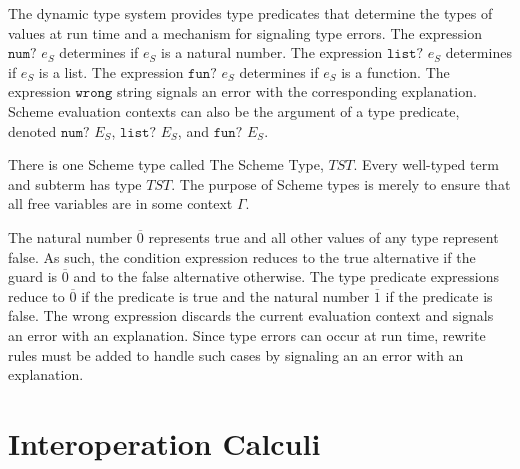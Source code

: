 The dynamic type system provides type predicates that determine the types of values at run time and a mechanism for signaling type errors.  The expression $\mathtt{num?}$ $e_{S}$ determines if $e_{S}$ is a natural number.  The expression $\mathtt{list?}$ $e_{S}$ determines if $e_{S}$ is a list.  The expression $\mathtt{fun?}$ $e_{S}$ determines if $e_{S}$ is a function.  The expression $\mathtt{wrong}$ string signals an error with the corresponding explanation.  Scheme evaluation contexts can also be the argument of a type predicate, denoted $\mathtt{num?}$ $E_{S}$, $\mathtt{list?}$ $E_{S}$, and $\mathtt{fun?}$ $E_{S}$.

There is one Scheme type called The Scheme Type, $TST$.  Every well-typed term and subterm has type $TST$.  The purpose of Scheme types is merely to ensure that all free variables are in some context $\Gamma$.

The natural number $\overline{0}$ represents true and all other values of any type represent false.  As such, the condition expression reduces to the true alternative if the guard is $\overline{0}$ and to the false alternative otherwise.  The type predicate expressions reduce to $\overline{0}$ if the predicate is true and the natural number $\overline{1}$ if the predicate is false.  The wrong expression discards the current evaluation context and signals an error with an explanation.  Since type errors can occur at run time, rewrite rules must be added to handle such cases by signaling an an error with an explanation.











\section{Interoperation Calculi}

